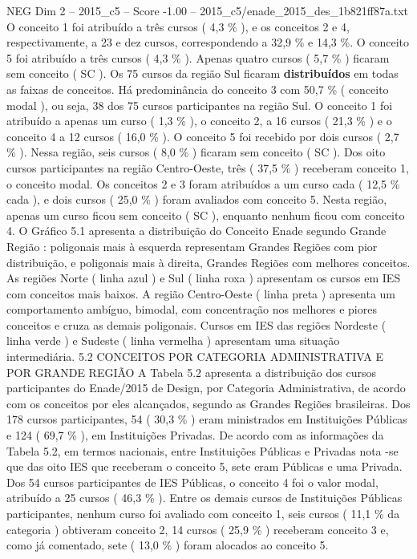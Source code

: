 \begin{textsample}{NEG Dim 2 – 2015\_c5 – Score -1.00 – 2015\_c5/enade\_2015\_des\_1b821ff87a.txt}
O conceito 1 foi atribuído a três cursos ( 4,3 \% ), e os conceitos 2 e 4, respectivamente, a 23 e dez cursos, correspondendo a 32,9 \% e 14,3 \%.
O conceito 5 foi atribuído a três cursos ( 4,3 \% ).
Apenas quatro cursos ( 5,7 \% ) ficaram sem conceito ( SC ).
Os 75 cursos da região Sul ficaram \textbf{distribuídos} em todas as faixas de conceitos.
Há predominância do conceito 3 com 50,7 \% ( conceito modal ), ou seja, 38 dos 75 cursos participantes na região Sul.
O conceito 1 foi atribuído a apenas um curso ( 1,3 \% ), o conceito 2, a 16 cursos ( 21,3 \% ) e o conceito 4 a 12 cursos ( 16,0 \% ).
O conceito 5 foi recebido por dois cursos ( 2,7 \% ).
Nessa região, seis cursos ( 8,0 \% ) ficaram sem conceito ( SC ).
Dos oito cursos participantes na região Centro-Oeste, três ( 37,5 \% ) receberam conceito 1, o conceito modal.
Os conceitos 2 e 3 foram atribuídos a um curso cada ( 12,5 \% cada ), e dois cursos ( 25,0 \% ) foram avaliados com conceito 5.
Nesta região, apenas um curso ficou sem conceito ( SC ), enquanto nenhum ficou com conceito 4.
O Gráfico 5.1 apresenta a distribuição do Conceito Enade segundo Grande Região : poligonais mais à esquerda representam Grandes Regiões com pior distribuição, e poligonais mais à direita, Grandes Regiões com melhores conceitos.
As regiões Norte ( linha azul ) e Sul ( linha roxa ) apresentam os cursos em IES com conceitos mais baixos.
A região Centro-Oeste ( linha preta ) apresenta um comportamento ambíguo, bimodal, com concentração nos melhores e piores conceitos e cruza as demais poligonais.
Cursos em IES das regiões Nordeste ( linha verde ) e Sudeste ( linha vermelha ) apresentam uma situação intermediária. 5.2 CONCEITOS POR CATEGORIA ADMINISTRATIVA E POR GRANDE REGIÃO A Tabela 5.2 apresenta a distribuição dos cursos participantes do Enade/2015 de Design, por Categoria Administrativa, de acordo com os conceitos por eles alcançados, segundo as Grandes Regiões brasileiras.
Dos 178 cursos participantes, 54 ( 30,3 \% ) eram ministrados em Instituições Públicas e 124 ( 69,7 \% ), em Instituições Privadas.
De acordo com as informações da Tabela 5.2, em termos nacionais, entre Instituições Públicas e Privadas nota -se que das oito IES que receberam o conceito 5, sete eram Públicas e uma Privada.
Dos 54 cursos participantes de IES Públicas, o conceito 4 foi o valor modal, atribuído a 25 cursos ( 46,3 \% ).
Entre os demais cursos de Instituições Públicas participantes, nenhum curso foi avaliado com conceito 1, seis cursos ( 11,1 \% da categoria ) obtiveram conceito 2, 14 cursos ( 25,9 \% ) receberam conceito 3 e, como já comentado, sete ( 13,0 \% ) foram alocados ao conceito 5.

\end{textsample}
